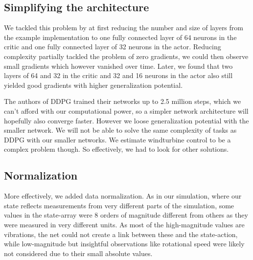 \documentclass[hyperref,final,beleg]{cgvpub}
\begin{document}
\subsection{Simplifying the architecture}

We tackled this problem by at first reducing the number and size of layers from the example implementation to one fully connected layer of 64 neurons in the critic and one fully connected layer of 32 neurons in the actor. Reducing complexity partially tackled the problem of zero gradients, we could then observe small gradients which however vanished over time. Later, we found that two layers of 64 and 32 in the critic and 32 and 16 neurons in the actor also still yielded good gradients with higher generalization potential.

The authors of \ac{DDPG} trained their networks up to 2.5 million steps, which we can't afford with our computational power, so a simpler network architecture will hopefully also converge faster. However we loose generalization potential with the smaller network. We will not be able to solve the same complexity of tasks as \ac{DDPG} with our smaller networks. We estimate windturbine control to be a complex problem though. So effectively, we had to look for other solutions.

\subsection{Normalization}

More effectively, we added data normalization. As in our simulation, where our state reflects measurements from very different parts of the simulation, some values in the state-array were 8 orders of magnitude different from others as they were measured in very different units. As most of the high-magnitude values are vibrations, the net could not create a link between these and the state-action, while low-magnitude but insightful observations like rotational speed were likely not considered due to their small absolute values. 
\end{document}
